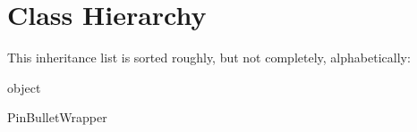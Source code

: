 \section{Class Hierarchy}
This inheritance list is sorted roughly, but not completely, alphabetically\+:\begin{DoxyCompactList}
\item object\begin{DoxyCompactList}
\item {}
\end{DoxyCompactList}
\item Pin\+Bullet\+Wrapper\begin{DoxyCompactList}
\item {}
\end{DoxyCompactList}
\end{DoxyCompactList}
